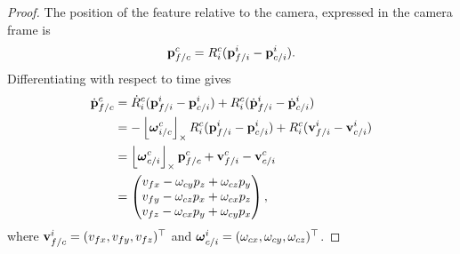 \begin{proof}
	The position of the feature relative to the camera, expressed in the camera frame is
	\[
	\mathbf{p}_{f/c}^c = R_i^c (\mathbf{p}_{f/i}^i - \mathbf{p}_{c/i}^i).
	\]
	Differentiating with respect to time gives
	\begin{align*}
	\dot{\mathbf{p}}_{f/c}^c &= \dot{R}_i^c (\mathbf{p}_{f/i}^i - \mathbf{p}_{c/i}^i) + R_i^c (\dot{\mathbf{p}}_{f/i}^i - \dot{\mathbf{p}}_{c/i}^i) \\
	&= -\left\lfloor\boldsymbol{\omega}_{i/c}^c\right\rfloor_{\times}R_i^c (\mathbf{p}_{f/i}^i - \mathbf{p}_{c/i}^i) + R_i^c (\mathbf{v}_{f/i}^i - \mathbf{v}_{c/i}^i) \\
	&= \left\lfloor\boldsymbol{\omega}_{c/i}^c\right\rfloor_{\times}\mathbf{p}_{f/c}^c  + \mathbf{v}_{f/i}^c - \mathbf{v}_{c/i}^c \\
	&= \begin{pmatrix} v_{fx} - \omega_{cy} p_z + \omega_{cz} p_y \\
	v_{fy} - \omega_{cz} p_x + \omega_{cx} p_z \\
	v_{fz} - \omega_{cx} p_y + \omega_{cy} p_x
	\end{pmatrix},
	\end{align*}
	where $\mathbf{v}_{f/c}^i=(v_{fx}, v_{fy}, v_{fz})^\top$ and $\boldsymbol{\omega}_{c/i}^i=(\omega_{cx}, \omega_{cy}, \omega_{cz})^\top$.
	

\end{proof}
